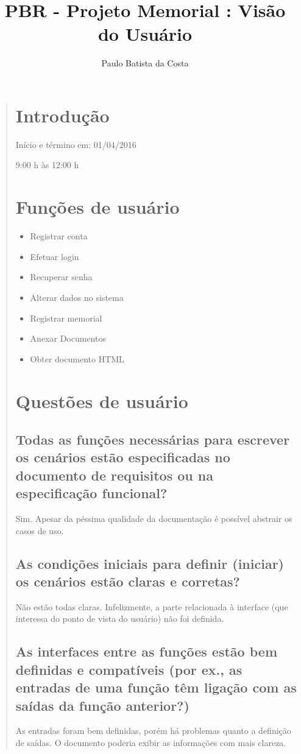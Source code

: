 \documentclass[12pt,a4paper]{report}
\author{Paulo Batista da Costa}
\title{PBR - Projeto Memorial : Visão do Usuário}
\begin{document}
\maketitle
\tableofcontents
\begin{quotation}
\newpage
\section{Introdução}
Início e término em: 01/04/2016

9:00 h às 12:00 h
\section{Funções de usuário}

\begin{itemize}
\item Registrar conta
\item Efetuar login
\item Recuperar senha
\item Alterar dados no sistema
\item Registrar memorial
\item Anexar Documentos
\item Obter documento HTML
\end{itemize}
\section{Questões de usuário}
\subsection{Todas as funções necessárias para escrever os cenários estão especificadas no documento de requisitos ou na especificação funcional?}
Sim. Apesar da péssima qualidade da documentação é possível abstrair os casos de uso.
\subsection{As condições iniciais para definir (iniciar) os cenários estão claras e corretas?}
Não estão todas claras. Infelizmente, a parte relacionada à interface (que interessa do ponto de vista do usuário) não foi definida.
\subsection{As interfaces entre as funções estão bem definidas e compatíveis (por ex., as entradas de uma função têm ligação com as saídas da função anterior?)}
As entradas foram bem definidas, porém há problemas quanto a definição de saídas. O documento poderia exibir as informações com mais clareza.

\end{quotation}
\end{document}
